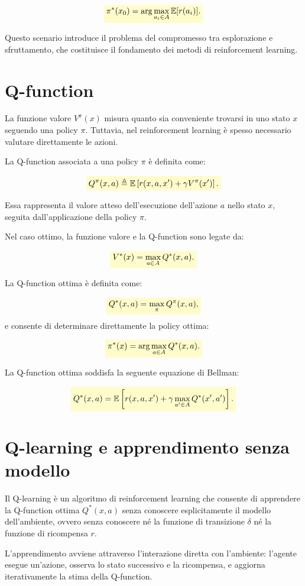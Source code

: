 \documentclass[a4paper,12pt]{report}
\newcommand{\highlight}[1]{%
\colorbox{yellow!20}{$\displaystyle #1$}%
}
\begin{document}
\[
\highlight{
\pi^*(x_0) = \arg\max_{a_i \in A} \mathbb{E}[r(a_i)].}
\]

Questo scenario introduce il problema del compromesso tra esplorazione
e sfruttamento, che costituisce il fondamento dei metodi di
reinforcement learning.

\section{Q-function}

La funzione valore $V^\pi(x)$ misura quanto sia conveniente trovarsi in
uno stato $x$ seguendo una policy $\pi$. Tuttavia, nel reinforcement
learning è spesso necessario valutare direttamente le azioni.

La Q-function associata a una policy $\pi$ è definita come:

\[
\highlight{
Q^\pi(x,a) \triangleq
\mathbb{E}\left[
r(x,a,x') + \gamma V^\pi(x')
\right]. }
\]

Essa rappresenta il valore atteso dell'esecuzione dell'azione $a$
nello stato $x$, seguita dall'applicazione della policy $\pi$.

Nel caso ottimo, la funzione valore e la Q-function sono legate da:

\[
\highlight{
V^*(x) = \max_{a \in A} Q^*(x,a).}
\]

La Q-function ottima è definita come:

\[
\highlight{
Q^*(x,a) = \max_\pi Q^\pi(x,a),}
\]
e consente di determinare direttamente la policy ottima:

\[
\highlight{
\pi^*(x) = \arg\max_{a \in A} Q^*(x,a).}
\]

La Q-function ottima soddisfa la seguente equazione di Bellman:

\[
\highlight{
Q^*(x,a) =
\mathbb{E}\left[
r(x,a,x') + \gamma \max_{a' \in A} Q^*(x',a')
\right].}
\]

\section{Q-learning e apprendimento senza modello}

Il Q-learning è un algoritmo di reinforcement learning che consente di
apprendere la Q-function ottima $Q^*(x,a)$ senza conoscere esplicitamente
il modello dell'ambiente, ovvero senza conoscere né la funzione di
transizione $\delta$ né la funzione di ricompensa $r$.

L'apprendimento avviene attraverso l'interazione diretta con l'ambiente:
l'agente esegue un'azione, osserva lo stato successivo e la ricompensa,
e aggiorna iterativamente la stima della Q-function.
\end{document}
